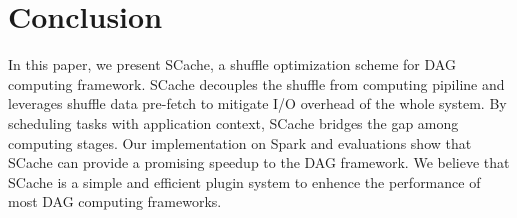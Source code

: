 \section{Conclusion}
 In this paper, we present SCache, a shuffle optimization scheme for DAG computing framework. SCache decouples the shuffle from computing pipiline and leverages shuffle data pre-fetch to mitigate I/O overhead of the whole system. By scheduling tasks with application context, SCache bridges the gap among computing stages. Our implementation on Spark and evaluations show that SCache can provide a promising speedup to the DAG framework. We believe that SCache is a simple and efficient plugin system to enhence the performance of most DAG computing frameworks.